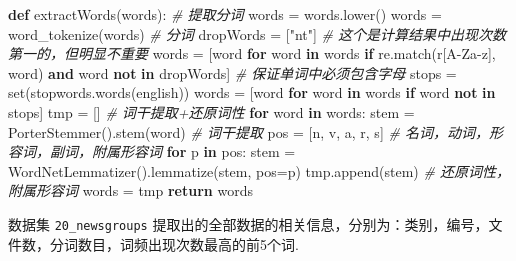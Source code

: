 \documentclass[
]{article}
\newenvironment{Shaded}{}{}
\newcommand{\BuiltInTok}[1]{#1}
\newcommand{\CommentTok}[1]{\textcolor[rgb]{0.38,0.63,0.69}{\textit{#1}}}
\newcommand{\ControlFlowTok}[1]{\textcolor[rgb]{0.00,0.44,0.13}{\textbf{#1}}}
\newcommand{\KeywordTok}[1]{\textcolor[rgb]{0.00,0.44,0.13}{\textbf{#1}}}
\newcommand{\NormalTok}[1]{#1}
\newcommand{\OperatorTok}[1]{\textcolor[rgb]{0.40,0.40,0.40}{#1}}
\newcommand{\StringTok}[1]{\textcolor[rgb]{0.25,0.44,0.63}{#1}}
\newcommand{\VerbatimStringTok}[1]{\textcolor[rgb]{0.25,0.44,0.63}{#1}}
\begin{document}
\begin{Shaded}
\begin{Highlighting}[]
\KeywordTok{def}\NormalTok{ extractWords(words):  }\CommentTok{\# 提取分词}
\NormalTok{    words }\OperatorTok{=}\NormalTok{ words.lower()}
\NormalTok{    words }\OperatorTok{=}\NormalTok{ word\_tokenize(words)  }\CommentTok{\# 分词}
\NormalTok{    dropWords }\OperatorTok{=}\NormalTok{ [}\StringTok{"n\textquotesingle{}t"}\NormalTok{]  }\CommentTok{\# 这个是计算结果中出现次数第一的，但明显不重要}
\NormalTok{    words }\OperatorTok{=}\NormalTok{ [word }\ControlFlowTok{for}\NormalTok{ word }\KeywordTok{in}\NormalTok{ words }\ControlFlowTok{if}\NormalTok{ re.match(}\VerbatimStringTok{r\textquotesingle{}[A{-}Za{-}z]\textquotesingle{}}\NormalTok{, word) }\KeywordTok{and}\NormalTok{ word }\KeywordTok{not} \KeywordTok{in}\NormalTok{ dropWords]  }\CommentTok{\# 保证单词中必须包含字母}
\NormalTok{    stops }\OperatorTok{=} \BuiltInTok{set}\NormalTok{(stopwords.words(}\StringTok{\textquotesingle{}english\textquotesingle{}}\NormalTok{))}
\NormalTok{    words }\OperatorTok{=}\NormalTok{ [word }\ControlFlowTok{for}\NormalTok{ word }\KeywordTok{in}\NormalTok{ words }\ControlFlowTok{if}\NormalTok{ word }\KeywordTok{not} \KeywordTok{in}\NormalTok{ stops]}
\NormalTok{    tmp }\OperatorTok{=}\NormalTok{ []  }\CommentTok{\# 词干提取+还原词性}
    \ControlFlowTok{for}\NormalTok{ word }\KeywordTok{in}\NormalTok{ words:}
\NormalTok{        stem }\OperatorTok{=}\NormalTok{ PorterStemmer().stem(word)  }\CommentTok{\# 词干提取}
\NormalTok{        pos }\OperatorTok{=}\NormalTok{ [}\StringTok{\textquotesingle{}n\textquotesingle{}}\NormalTok{, }\StringTok{\textquotesingle{}v\textquotesingle{}}\NormalTok{, }\StringTok{\textquotesingle{}a\textquotesingle{}}\NormalTok{, }\StringTok{\textquotesingle{}r\textquotesingle{}}\NormalTok{, }\StringTok{\textquotesingle{}s\textquotesingle{}}\NormalTok{]  }\CommentTok{\# 名词，动词，形容词，副词，附属形容词}
        \ControlFlowTok{for}\NormalTok{ p }\KeywordTok{in}\NormalTok{ pos:}
\NormalTok{            stem }\OperatorTok{=}\NormalTok{ WordNetLemmatizer().lemmatize(stem, pos}\OperatorTok{=}\NormalTok{p)}
\NormalTok{        tmp.append(stem)  }\CommentTok{\# 还原词性，附属形容词}
\NormalTok{    words }\OperatorTok{=}\NormalTok{ tmp}
    \ControlFlowTok{return}\NormalTok{ words}
\end{Highlighting}
\end{Shaded}

数据集 \texttt{20\_newsgroups}
提取出的全部数据的相关信息，分别为：类别，编号，文件数，分词数目，词频出现次数最高的前5个词.
\end{document}
